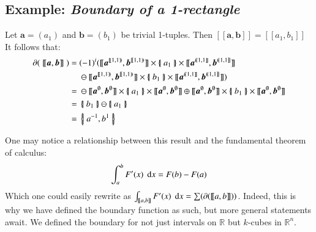 \subsection{Example: \emph{Boundary of a 1-rectangle}}
Let $\boldsymbol{a}= (a_1)$ and $\boldsymbol{b} = (b_1)$ be trivial 1-tuples. 
Then $[\![\boldsymbol{a}, \boldsymbol{b}]\!] = [\![a_1, b_1]\!]$
It follows that:
\begin{align*}
	\partial ( \; [\![ \boldsymbol{a}, \boldsymbol{b} ]\!] \; )
	=& \; (-1)^i ( [\![\boldsymbol{a}^{[\![1,1)\!)}, \boldsymbol{b}^{[\![1,1)\!)} ]\!]
	\times \hset{a_1} \times
	[\![\boldsymbol{a}^{(\!(1,1]\!]}, \boldsymbol{b}^{(\!(1,1]\!]} ]\!]\\
	&\; \ominus
	[\![\boldsymbol{a}^{[\![1,1)\!)}, \boldsymbol{b}^{[\![1,1)\!)} ]\!]
	\times \hset{b_1} \times
	[\![\boldsymbol{a}^{(\!(1,1]\!]}, \boldsymbol{b}^{(\!(1,1]\!]} ]\!] )\\
	=& \; \ominus [\![\boldsymbol{a}^{\emptyset}, \boldsymbol{b}^{\emptyset} ]\!]
	\times \hset{a_1} \times
	[\![\boldsymbol{a}^{\emptyset}, \boldsymbol{b}^{\emptyset} ]\!]
	\oplus
	[\![\boldsymbol{a}^{\emptyset}, \boldsymbol{b}^{\emptyset} ]\!]
	\times \hset{b_1} \times
	[\![\boldsymbol{a}^{\emptyset}, \boldsymbol{b}^{\emptyset} ]\!] \\
	=& \; \hset{b_1} \ominus \hset{a_1} \\
	=& \; \hset{a^{-1}, b^{1}}
\end{align*}

One may notice a relationship between this result and the fundamental theorem of calculus:
\begin{equation}
	\int_a^b F'(x) \; \mathop{}\!\mathrm{d} x = F(b) - F(a)
\end{equation}
Which one could easily rewrite as $\int_{[\![a,b]\!]} F'(x) \; \mathop{}\!\mathrm{d} x = \sum (\partial([\![a,b]\!]))$.
Indeed, this is why we have defined the boundary function as such, but more general statements await.
We defined the boundary for not just intervals on $\mathbb{R}$ but $k$-cubes in $\mathbb{R}^n$.




